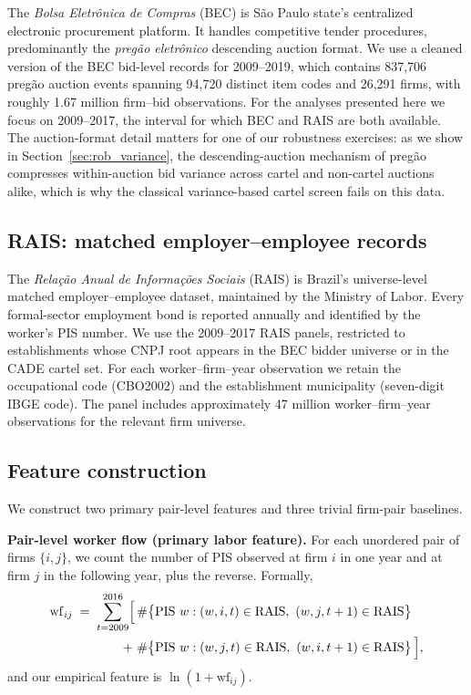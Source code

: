 The \emph{Bolsa Eletr\^{o}nica de Compras} (BEC) is S\~{a}o Paulo state's centralized electronic procurement platform. It handles competitive tender procedures, predominantly the \emph{preg\~{a}o eletr\^{o}nico} descending auction format. We use a cleaned version of the BEC bid-level records for 2009--2019, which contains 837{,}706 preg\~{a}o auction events spanning 94{,}720 distinct item codes and 26{,}291 firms, with roughly 1.67 million firm--bid observations. For the analyses presented here we focus on 2009--2017, the interval for which BEC and RAIS are both available. The auction-format detail matters for one of our robustness exercises: as we show in Section~\ref{sec:rob_variance}, the descending-auction mechanism of preg\~{a}o compresses within-auction bid variance across cartel and non-cartel auctions alike, which is why the classical variance-based cartel screen fails on this data.

\subsection{RAIS: matched employer--employee records}\label{sec:data_rais}

The \emph{Rela\c{c}\~{a}o Anual de Informa\c{c}\~{o}es Sociais} (RAIS) is Brazil's universe-level matched employer--employee dataset, maintained by the Ministry of Labor. Every formal-sector employment bond is reported annually and identified by the worker's PIS number. We use the 2009--2017 RAIS panels, restricted to establishments whose CNPJ root appears in the BEC bidder universe or in the CADE cartel set. For each worker--firm--year observation we retain the occupational code (CBO2002) and the establishment municipality (seven-digit IBGE code). The panel includes approximately 47 million worker--firm--year observations for the relevant firm universe.

\subsection{Feature construction}\label{sec:data_features}

We construct two primary pair-level features and three trivial firm-pair baselines.

\textbf{Pair-level worker flow (primary labor feature).} For each unordered pair of firms $\{i, j\}$, we count the number of PIS observed at firm $i$ in one year and at firm $j$ in the following year, plus the reverse. Formally,
\begin{align*}
\mathrm{wf}_{ij} \;=\; \sum_{t=2009}^{2016}\Bigl[\,
& \#\bigl\{\text{PIS}\ w : (w, i, t) \in \text{RAIS},\ (w, j, t+1) \in \text{RAIS}\bigr\} \\
+\ & \#\bigl\{\text{PIS}\ w : (w, j, t) \in \text{RAIS},\ (w, i, t+1) \in \text{RAIS}\bigr\}\,\Bigr],
\end{align*}
and our empirical feature is $\ln(1 + \mathrm{wf}_{ij})$.

